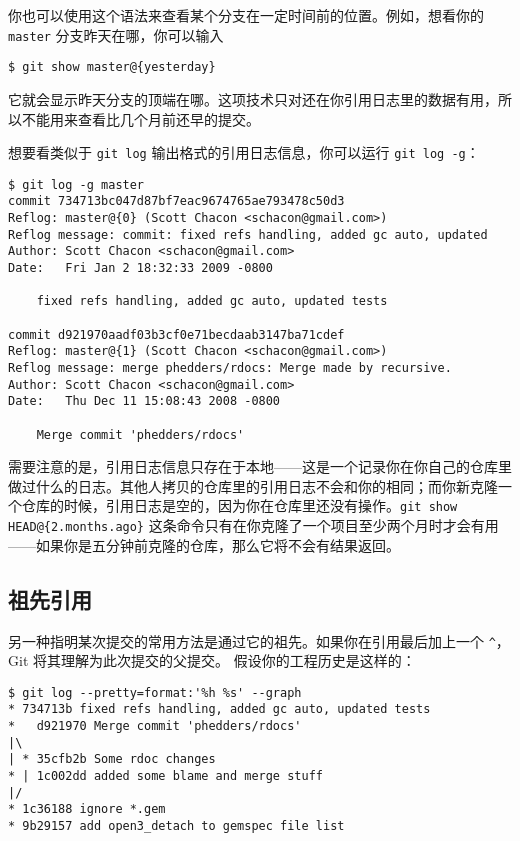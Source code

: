 \documentclass[a4paper]{book}
\begin{document}
你也可以使用这个语法来查看某个分支在一定时间前的位置。例如，想看你的 \texttt{master} 分支昨天在哪，你可以输入

\begin{shaded}\begin{verbatim}
$ git show master@{yesterday}
\end{verbatim}\end{shaded}

它就会显示昨天分支的顶端在哪。这项技术只对还在你引用日志里的数据有用，所以不能用来查看比几个月前还早的提交。

想要看类似于 \texttt{git log} 输出格式的引用日志信息，你可以运行 \texttt{git log -g}：

\begin{shaded}\begin{verbatim}
$ git log -g master
commit 734713bc047d87bf7eac9674765ae793478c50d3
Reflog: master@{0} (Scott Chacon <schacon@gmail.com>)
Reflog message: commit: fixed refs handling, added gc auto, updated 
Author: Scott Chacon <schacon@gmail.com>
Date:   Fri Jan 2 18:32:33 2009 -0800

    fixed refs handling, added gc auto, updated tests

commit d921970aadf03b3cf0e71becdaab3147ba71cdef
Reflog: master@{1} (Scott Chacon <schacon@gmail.com>)
Reflog message: merge phedders/rdocs: Merge made by recursive.
Author: Scott Chacon <schacon@gmail.com>
Date:   Thu Dec 11 15:08:43 2008 -0800

    Merge commit 'phedders/rdocs'
\end{verbatim}\end{shaded}

需要注意的是，引用日志信息只存在于本地------这是一个记录你在你自己的仓库里做过什么的日志。其他人拷贝的仓库里的引用日志不会和你的相同；而你新克隆一个仓库的时候，引用日志是空的，因为你在仓库里还没有操作。\texttt{git show HEAD@\{2.months.ago\}} 这条命令只有在你克隆了一个项目至少两个月时才会有用------如果你是五分钟前克隆的仓库，那么它将不会有结果返回。

\subsection{祖先引用}

另一种指明某次提交的常用方法是通过它的祖先。如果你在引用最后加上一个 \texttt{\^{}}，Git 将其理解为此次提交的父提交。 假设你的工程历史是这样的：

\begin{shaded}\begin{verbatim}
$ git log --pretty=format:'%h %s' --graph
* 734713b fixed refs handling, added gc auto, updated tests
*   d921970 Merge commit 'phedders/rdocs'
|\  
| * 35cfb2b Some rdoc changes
* | 1c002dd added some blame and merge stuff
|/  
* 1c36188 ignore *.gem
* 9b29157 add open3_detach to gemspec file list
\end{verbatim}\end{shaded}
\end{document}
